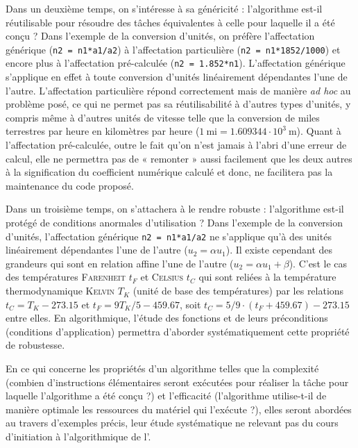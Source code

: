 Dans un deuxième temps, on s'intéresse à sa généricité : l'algorithme
est-il réutilisable pour résoudre des tâches équivalentes à celle 
pour laquelle il a été conçu ?
Dans l'exemple de la conversion d'unités, on préfère l'affectation
générique (\texttt{n2 = n1*a1/a2}) à l'affectation particulière
(\texttt{n2 = n1*1852/1000}) et encore plus à l'affectation pré-calculée
(\texttt{n2 = 1.852*n1}). L'affectation générique s'applique en effet
à toute conversion d'unités linéairement dépendantes l'une de l'autre.
L'affectation particulière répond correctement mais de manière \emph{ad hoc} 
au problème posé, ce qui ne permet pas sa réutilisabilité à d'autres types d'unités,
y compris même à d'autres unités de vitesse telle que la conversion de miles terrestres
par heure en kilomètres par heure  ($1\ \mbox{mi} = 1.609344\cdot 10^3\ \mbox{m}$). Quant à l'affectation pré-calculée, outre le fait qu'on n'est jamais à l'abri d'une erreur de calcul, elle ne permettra pas de « remonter » 
aussi facilement que les deux autres à la signification du coefficient numérique calculé et
donc, ne facilitera pas la maintenance du code proposé.

Dans un troisième temps, on s'attachera à le rendre robuste : 
l'algorithme est-il protégé de conditions anormales d'utilisation ?
Dans l'exemple de la conversion d'unités, l'affectation générique \texttt{n2 = n1*a1/a2}
ne s'applique qu'à des unités linéairement dépendantes l'une de l'autre ($u_2 = \alpha u_1$).
Il existe cependant des grandeurs qui sont en relation affine l'une de l'autre 
($u_2 = \alpha u_1 + \beta$).
C'est le cas des températures \textsc{Farenheit} $t_F$ et \textsc{Celsius} $t_C$ qui sont reliées à la température thermodynamique \textsc{Kelvin} $T_K$ 
(unité de base des températures) 
par les relations $t_C =  T_K - 273.15$ et $t_F = 9T_K/5 - 459.67$, 
soit $t_C = 5/9\cdot(t_F + 459.67) - 273.15$ entre elles.
En algorithmique, l'étude des fonctions et de leurs préconditions (conditions d'application)
permettra d'aborder systématiquement cette propriété de robustesse.

En ce qui concerne les propriétés d'un algorithme telles que la complexité 
(combien d'instruc\-tions élémentaires seront exécutées pour réaliser la tâche pour 
laquelle l'algorithme a été conçu ?) et l'efficacité 
(l'algorithme utilise-t-il de manière optimale les ressources du matériel qui l'exécu\-te ?),
elles seront abordées au travers d'exemples précis, leur étude systématique ne relevant pas
du cours d'initiation à l'algorithmique de l'\enib.

